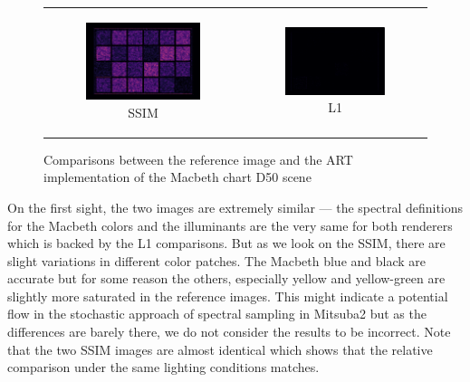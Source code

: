 \begin{figure}[h]
\begin{tabular}{cc}
\begin{subfigure}
			{0.4\textwidth}\centering\includegraphics[width=\linewidth]{img/macbeth_chart_D50_SSIM.png}
			\caption{SSIM}
		\end{subfigure} 
		&
		\begin{subfigure}
			{0.4\textwidth}\centering\includegraphics[width=\linewidth]{img/macbeth_chart_D50_L1.png}
			\caption{L1}
		\end{subfigure}
	\end{tabular}
	\caption{Comparisons between the reference image and the ART implementation of the Macbeth chart D50 scene}
	\label{fig:compare_macbeth_d50}
\end{figure}

On the first sight, the two images are extremely similar --- the spectral definitions for the Macbeth colors and the illuminants are the very same for both renderers which is backed by the L1 comparisons. But as we look on the SSIM, there are slight variations in different color patches. The Macbeth blue and black are accurate but for some reason the others, especially yellow and yellow-green are slightly more saturated in the reference images. This might indicate a potential flow in the stochastic approach of spectral sampling in Mitsuba2 but as the differences are barely there, we do not consider the results to be incorrect. Note that the two SSIM images are almost identical which shows that the relative comparison under the same lighting conditions matches.  

